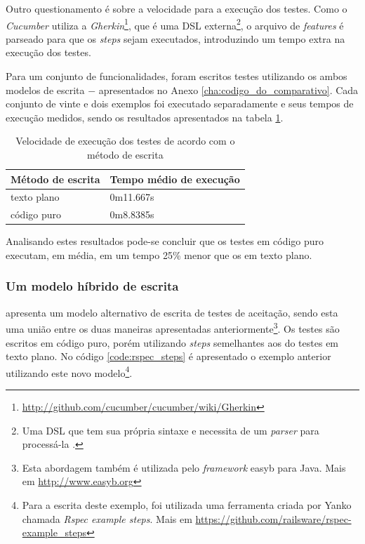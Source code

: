 Outro questionamento é sobre a velocidade para a execução dos testes. Como o \textit{Cucumber} utiliza a \textit{Gherkin}\footnote{\url{http://github.com/cucumber/cucumber/wiki/Gherkin}}, que é uma DSL externa\footnote{Uma DSL que tem sua própria sintaxe e necessita de um \textit{parser} para processá-la \cite{DSLFowler}.}, o arquivo de \textit{features} é parseado para que os \textit{steps} sejam executados, introduzindo um tempo extra na execução dos testes.

Para um conjunto de funcionalidades, foram escritos testes utilizando os ambos modelos de escrita $-$ apresentados no Anexo \ref{cha:codigo_do_comparativo}. Cada conjunto de vinte e dois exemplos foi executado separadamente e seus tempos de execução medidos, sendo os resultados apresentados na tabela \ref{table:tempo_de_execucao}.

\begin{table}[ht]
\caption{Velocidade de execução dos testes de acordo com o método de escrita}
\label{table:tempo_de_execucao}
\centering
\begin{tabular}{p{4.5cm} p{6.5cm}}
\toprule
\textbf{Método de escrita} & \textbf{Tempo médio de execução} \\
\midrule[1pt]
texto plano & 0m11.667s \\ \midrule
código puro & 0m8.8385s \\
\bottomrule
\end{tabular}
\end{table}

Analisando estes resultados pode-se concluir que os testes em código puro executam, em média, em um tempo 25\% menor que os em texto plano.


\subsubsection{Um modelo híbrido de escrita}
\label{ssub:um_modelo_hibrido_de_escrita}

 apresenta um modelo alternativo de escrita de testes de aceitação, sendo esta uma união entre os duas maneiras apresentadas anteriormente\footnote{Esta abordagem também é utilizada pelo \textit{framework} easyb para Java. Mais em \url{http://www.easyb.org}}. Os testes são escritos em código puro, porém utilizando \textit{steps} semelhantes aos do testes em texto plano. No código \ref{code:rspec_steps} é apresentado o exemplo anterior utilizando este novo modelo\footnote{Para a escrita deste exemplo, foi utilizada uma ferramenta criada por Yanko chamada \textit{Rspec example steps}. Mais em \url{https://github.com/railsware/rspec-example_steps}}.

